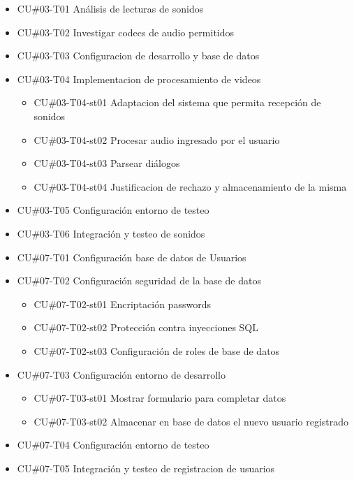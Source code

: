 \begin{enumerate}
\begin{itemize}
    \item CU\#03-T01 Análisis de lecturas de sonidos
    \item CU\#03-T02 Investigar codecs de audio permitidos
    \item CU\#03-T03 Configuracion de desarrollo y base de datos
    \item CU\#03-T04 Implementacion de procesamiento de videos
    \begin{itemize}
        \item CU\#03-T04-st01 Adaptacion del sistema que permita recepción de sonidos
        \item CU\#03-T04-st02 Procesar audio ingresado por el usuario
        \item CU\#03-T04-st03 Parsear diálogos
        \item CU\#03-T04-st04 Justificacion de rechazo y almacenamiento de la misma
    \end{itemize}
    \item CU\#03-T05 Configuración entorno de testeo
    \item CU\#03-T06 Integración y testeo de sonidos                      
\end{itemize}


\begin{itemize}
    \item CU\#07-T01 Configuración base de datos de Usuarios
    \item CU\#07-T02 Configuración seguridad de la base de datos
    \begin{itemize}
        \item CU\#07-T02-st01 Encriptación passwords
        \item CU\#07-T02-st02 Protección contra inyecciones SQL
        \item CU\#07-T02-st03 Configuración de roles de base de datos
    \end{itemize}
    \item CU\#07-T03 Configuración entorno de desarrollo
    \begin{itemize}
        \item CU\#07-T03-st01 Mostrar formulario para completar datos
        \item CU\#07-T03-st02 Almacenar en base de datos el nuevo usuario registrado
    \end{itemize}
    \item CU\#07-T04 Configuración entorno de testeo
    \item CU\#07-T05 Integración y testeo de registracion de usuarios
\end{itemize}


\end{enumerate}
